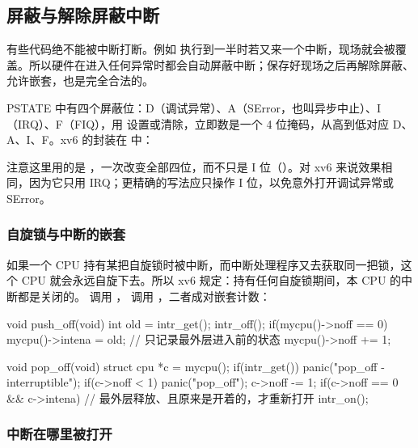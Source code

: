 \subsection{屏蔽与解除屏蔽中断}

有些代码绝不能被中断打断。例如  执行到一半时若又来一个中断，现场就会被覆盖。所以硬件在进入任何异常时都会自动屏蔽中断；保存好现场之后再解除屏蔽、允许嵌套，也是完全合法的。

PSTATE 中有四个屏蔽位：D（调试异常）、A（SError，也叫异步中止）、I（IRQ）、F（FIQ），用  设置或清除，立即数是一个 4 位掩码，从高到低对应 D、A、I、F。xv6 的封装在  中：


注意这里用的是 ，一次改变全部四位，而不只是 I 位（）。对 xv6 来说效果相同，因为它只用 IRQ；更精确的写法应只操作 I 位，以免意外打开调试异常或 SError。

\subsubsection{自旋锁与中断的嵌套}


如果一个 CPU 持有某把自旋锁时被中断，而中断处理程序又去获取同一把锁，这个 CPU 就会永远自旋下去。所以 xv6 规定：持有任何自旋锁期间，本 CPU 的中断都是关闭的。 调用 ， 调用 ，二者成对嵌套计数：

\begin{ccode}
void push_off(void)
{
  int old = intr_get();
  intr_off();
  if(mycpu()->noff == 0)
    mycpu()->intena = old;          // 只记录最外层进入前的状态
  mycpu()->noff += 1;
}

void pop_off(void)
{
  struct cpu *c = mycpu();
  if(intr_get())
    panic("pop_off - interruptible");
  if(c->noff < 1)
    panic("pop_off");
  c->noff -= 1;
  if(c->noff == 0 && c->intena)     // 最外层释放、且原来是开着的，才重新打开
    intr_on();
}
\end{ccode}

\subsubsection{中断在哪里被打开}


